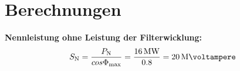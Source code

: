 \section{Berechnungen}

\textbf{Nennleistung ohne Leistung der Filterwicklung:}
\begin{equation}
    S_\mathrm{N}=\frac{P_\mathrm{N}}{cos \Phi_\mathrm{max}}=\frac{\SI{16}{\MW}}{0.8}=\SI{20}{\mega\voltampere} 
\end{equation}